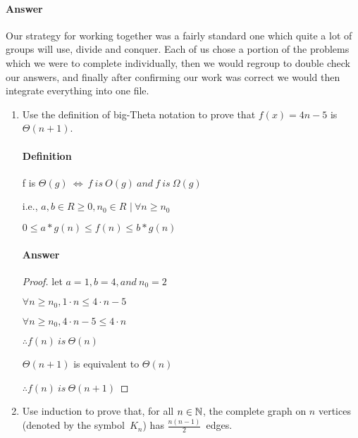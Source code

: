 \documentclass{article}
\begin{document}
\paragraph{Answer}

Our strategy for working together was a fairly standard one which quite a lot of groups will use, divide and conquer. Each of us chose a portion of the problems which we were to complete individually, then we would regroup to double check our answers, and finally after confirming our work was correct we would then integrate everything into one file.


\collab{\todo{}}

\begin{enumerate}

	\item Use the definition of big-Theta notation to prove that $f(x)=4n-5$
	      is $\Theta(n+1)$.

	      \paragraph{Definition}
	      f is $\Theta(g)\ \iff\ f\ is\ O(g)\ and\ f\ is\ \Omega(g)$

	      i.e., $ a, b \in R \geq 0, n_{0} \in R$
	      $|\ \forall n \geq n_0$

	      $0 \leq a* g(n) \leq f(n) \leq b*g(n)$

	      \paragraph{Answer}
	      \begin{proof}
		      let $a = 1, b = 4, and\ n_0 = 2$

		      $\forall n \geq n_0, 1 \cdot n \leq 4 \cdot n - 5$

		      $\forall n \geq n_0, 4 \cdot n - 5 \leq 4 \cdot n$

		      $\therefore f(n)\ is\ \Theta(n)$

		      $\Theta(n+1)$ is equivalent to $\Theta(n)$

		      $\therefore f(n)\ is\ \Theta(n+1)$
	      \end{proof}

	\item Use induction to prove that, for all $n \in {\mathbb N}$, the complete graph on
	      $n$ vertices (denoted by the symbol~$K_n$) has $\frac{n(n-1)}{2}$~edges.


\end{enumerate}
\end{document}
